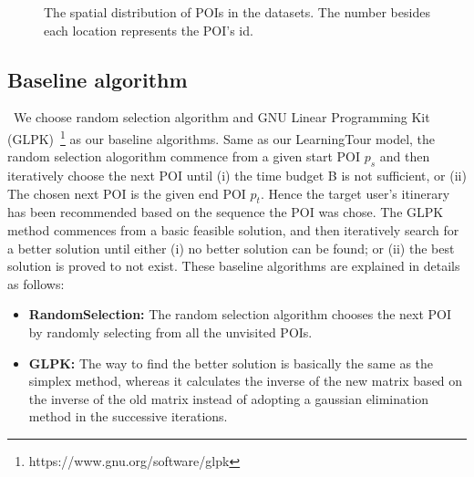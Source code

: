\documentclass[runningheads]{llncs}
\begin{document}
\begin{figure}
	\centering
	\quad
	\caption{The spatial distribution of POIs in the datasets. The number besides each location represents the POI's id.}
	\label{fig:e3}
\end{figure}
\subsection{Baseline algorithm}
\quad\, We choose random selection algorithm and GNU Linear Programming Kit (GLPK)~\footnote{https://www.gnu.org/software/glpk} as our baseline algorithms. Same as our LearningTour model, the random selection alogorithm commence from a given start POI $p_s$ and then iteratively choose the next POI until (i) the time budget B is not sufficient, or (ii) The chosen next POI is the given end POI $p_t$. Hence the target user's itinerary has been recommended based on the sequence the POI was chose. The GLPK method commences from a basic feasible solution, and then iteratively search for a better solution until either (i) no better solution can be found; or (ii) the best solution is proved to not exist. These baseline algorithms are explained in details as follows:
\begin{itemize}
	\item \textbf{RandomSelection:} The random selection algorithm chooses the next POI by randomly selecting from all the unvisited POIs.
	\item\textbf{GLPK:} The way to find the better solution is basically the same as the simplex method, whereas it calculates the inverse of the new matrix based on the inverse of the old matrix instead of adopting a gaussian elimination method in the successive iterations.
\end{itemize} 
\end{document}
